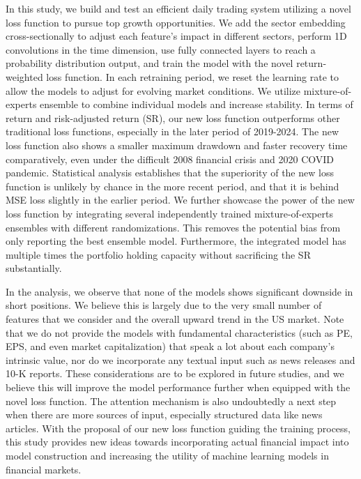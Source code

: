 \documentclass[preprint,12pt,numafflabel,authoryear]{elsarticle}
\begin{document}
In this study, we build and test an efficient daily trading system utilizing a novel loss function to pursue top growth opportunities. We add the sector embedding cross-sectionally to adjust each feature's impact in different sectors, perform 1D convolutions in the time dimension, use fully connected layers to reach a probability distribution output, and train the model with the novel return-weighted loss function. In each retraining period, we reset the learning rate to allow the models to adjust for evolving market conditions. We utilize mixture-of-experts ensemble to combine individual models and increase stability. In terms of return and risk-adjusted return (SR), our new loss function outperforms other traditional loss functions, especially in the later period of 2019-2024. The new loss function also shows a smaller maximum drawdown and faster recovery time comparatively, even under the difficult 2008 financial crisis and 2020 COVID pandemic. Statistical analysis establishes that the superiority of the new loss function is unlikely by chance in the more recent period, and that it is behind MSE loss slightly in the earlier period. We further showcase the power of the new loss function by integrating several independently trained mixture-of-experts ensembles with different randomizations. This removes the potential bias from only reporting the best ensemble model. Furthermore, the integrated model has multiple times the portfolio holding capacity without sacrificing the SR substantially.

In the analysis, we observe that none of the models shows significant downside in short positions. We believe this is largely due to the very small number of features that we consider and the overall upward trend in the US market. Note that we do not provide the models with fundamental characteristics (such as PE, EPS, and even market capitalization) that speak a lot about each company's intrinsic value, nor do we incorporate any textual input such as news releases and 10-K reports. These considerations are to be explored in future studies, and we believe this will improve the model performance further when equipped with the novel loss function. The attention mechanism is also undoubtedly a next step when there are more sources of input, especially structured data like news articles. With the proposal of our new loss function guiding the training process, this study provides new ideas towards incorporating actual financial impact into model construction and increasing the utility of machine learning models in financial markets.
\end{document}
